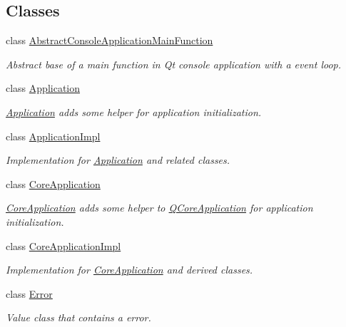 \subsection*{Classes}
\begin{DoxyCompactItemize}
\item 
class \hyperlink{class_mdt_1_1_abstract_console_application_main_function}{Abstract\+Console\+Application\+Main\+Function}
\begin{DoxyCompactList}\small\item\em Abstract base of a main function in Qt console application with a event loop. \end{DoxyCompactList}\item 
class \hyperlink{class_mdt_1_1_application}{Application}
\begin{DoxyCompactList}\small\item\em \hyperlink{class_mdt_1_1_application}{Application} adds some helper for application initialization. \end{DoxyCompactList}\item 
class \hyperlink{class_mdt_1_1_application_impl}{Application\+Impl}
\begin{DoxyCompactList}\small\item\em Implementation for \hyperlink{class_mdt_1_1_application}{Application} and related classes. \end{DoxyCompactList}\item 
class \hyperlink{class_mdt_1_1_core_application}{Core\+Application}
\begin{DoxyCompactList}\small\item\em \hyperlink{class_mdt_1_1_core_application}{Core\+Application} adds some helper to \hyperlink{class_q_core_application}{Q\+Core\+Application} for application initialization. \end{DoxyCompactList}\item 
class \hyperlink{class_mdt_1_1_core_application_impl}{Core\+Application\+Impl}
\begin{DoxyCompactList}\small\item\em Implementation for \hyperlink{class_mdt_1_1_core_application}{Core\+Application} and derived classes. \end{DoxyCompactList}\item 
class \hyperlink{class_mdt_1_1_error}{Error}
\begin{DoxyCompactList}\small\item\em Value class that contains a error. \end{DoxyCompactList}\item 

\end{DoxyCompactItemize}
